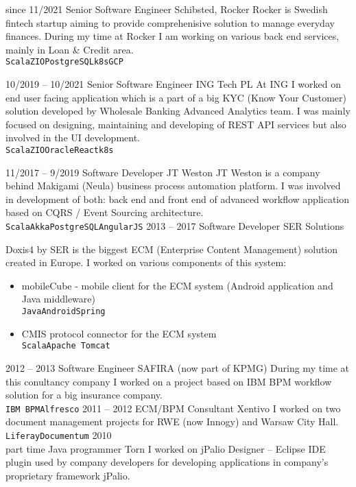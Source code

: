 \documentclass[8pt]{developercv} %
\begin{document}
\begin{entrylist}
	\entry
		{since 11/2021}
		{Senior Software Engineer}
		{Schibsted, Rocker}
    {Rocker is Swedish fintech startup aiming to provide comprehenisive solution to manage everyday finances. During my time at Rocker I am working on various back end services, mainly in Loan \& Credit area.\\
		\texttt{Scala}\slashsep\texttt{ZIO}\slashsep\texttt{PostgreSQL}\slashsep\texttt{k8s}\slashsep\texttt{GCP}}

	\entry
		{10/2019 -- 10/2021}
		{Senior Software Engineer}
		{ING Tech PL}
		{At ING I worked on end user facing application which is a part of a big KYC (Know Your Customer) solution developed by Wholesale Banking Advanced Analytics team. I was mainly focused on designing, maintaining and developing of REST API services but also involved in the UI development.\\
		\texttt{Scala}\slashsep\texttt{ZIO}\slashsep\texttt{Oracle}\slashsep\texttt{React}\slashsep\texttt{k8s}}

	\entry
		{11/2017 -- 9/2019}
		{Software Developer}
		{JT Weston}
		{JT Weston is a company behind Makigami (Neula) business process automation platform. I was involved in development of both: back end and front end of advanced workflow application based on CQRS / Event Sourcing architecture.\\
		\texttt{Scala}\slashsep\texttt{Akka}\slashsep\texttt{PostgreSQL}\slashsep\texttt{AngularJS}}
	\entry
		{2013 -- 2017}
		{Software Developer}
		{SER Solutions}
		{Doxis4 by SER is the biggest ECM (Enterprise Content Management) solution created in Europe. I worked on various components of this system:
		\begin{itemize}
			\item mobileCube - mobile client for the ECM system (Android application and Java middleware) \\ \texttt{Java}\slashsep\texttt{Android}\slashsep\texttt{Spring}
			\item CMIS protocol connector for the ECM system \\ \texttt{Scala}\slashsep\texttt{Apache Tomcat}
		\end{itemize}}
	\entry
		{2012 -- 2013}
		{Software Engineer}
		{SAFIRA (now part of KPMG)}
		{During my time at this conultancy company I worked on a project based on IBM BPM workflow solution for a big insurance company. \\ \texttt{IBM BPM}\slashsep\texttt{Alfresco}}
	\entry
		{2011 -- 2012}
		{ECM/BPM Consultant}
		{Xentivo}
		{I worked on two document management projects for RWE (now Innogy) and Warsaw City Hall. \\ \texttt{Liferay}\slashsep\texttt{Documentum}}
	\entry
		{2010 \\\footnotesize{part time}}
		{Java programmer}
		{Torn}
		{I worked on jPalio Designer -- Eclipse IDE plugin used by company developers for developing applications in company's proprietary framework jPalio.}
			
\end{entrylist}
\end{document}
